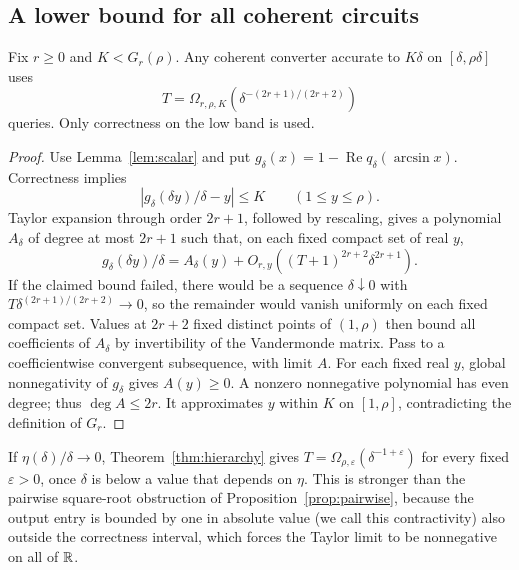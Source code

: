 \subsection{A lower bound for all coherent circuits}
\begin{theorem}\label{thm:hierarchy}
Fix $r\geq0$ and $K<G_r(\rho)$. Any coherent converter accurate to $K\delta$ on $[\delta,\rho\delta]$ uses
\[
 T=\Omega_{r,\rho,K}(\delta^{-(2r+1)/(2r+2)})
\]
queries. Only correctness on the low band is used.
\end{theorem}
\begin{proof}
Use Lemma~\ref{lem:scalar} and put $g_\delta(x)=1-\operatorname{Re}q_\delta(\arcsin x)$. Correctness implies
\[
 |g_\delta(\delta y)/\delta-y|\leq K\qquad(1\leq y\leq\rho).
\]
Taylor expansion through order $2r+1$, followed by rescaling, gives a polynomial $A_\delta$ of degree at most $2r+1$ such that, on each fixed compact set of real $y$,
\[
 g_\delta(\delta y)/\delta=A_\delta(y)
 +O_{r,y}((T+1)^{2r+2}\delta^{2r+1}).
\]
If the claimed bound failed, there would be a sequence $\delta\downarrow0$ with $T\delta^{(2r+1)/(2r+2)}\to0$, so the remainder would vanish uniformly on each fixed compact set. Values at $2r+2$ fixed distinct points of $(1,\rho)$ then bound all coefficients of $A_\delta$ by invertibility of the Vandermonde matrix. Pass to a coefficientwise convergent subsequence, with limit $A$. For each fixed real $y$, global nonnegativity of $g_\delta$ gives $A(y)\geq0$. A nonzero nonnegative polynomial has even degree; thus $\deg A\leq2r$. It approximates $y$ within $K$ on $[1,\rho]$, contradicting the definition of $G_r$.
\end{proof}
If $\eta(\delta)/\delta\to0$, Theorem~\ref{thm:hierarchy} gives $T=\Omega_{\rho,\varepsilon}(\delta^{-1+\varepsilon})$ for every fixed $\varepsilon>0$, once $\delta$ is below a value that depends on $\eta$. This is stronger than the pairwise square-root obstruction of Proposition~\ref{prop:pairwise}, because the output entry is bounded by one in absolute value (we call this contractivity) also outside the correctness interval, which forces the Taylor limit to be nonnegative on all of $\mathbb R$.

